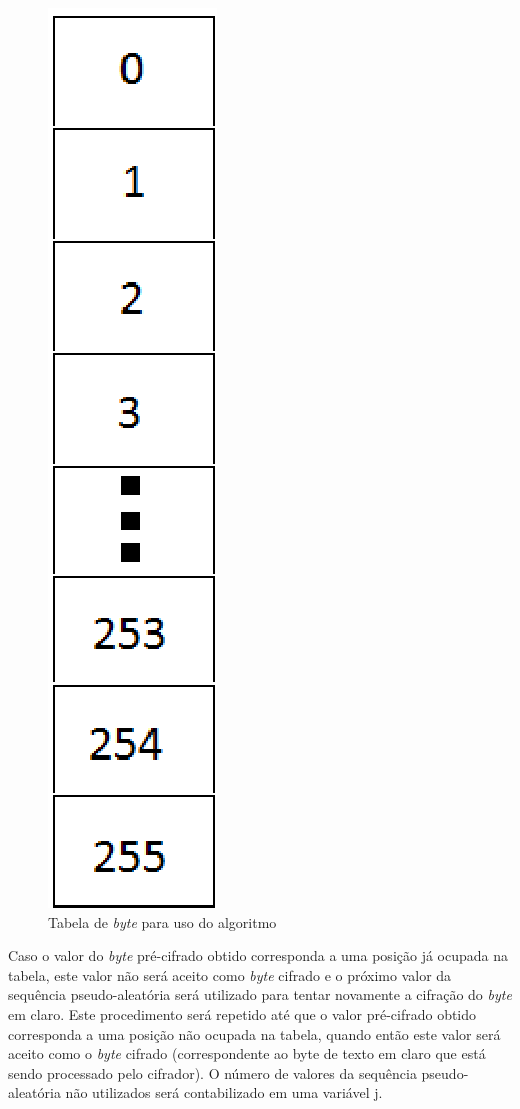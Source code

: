 \begin{figure}[h]
	\centering
	\includegraphics[scale=0.7]{figuras/tabela.eps}
	\caption{Tabela de \textit{byte} para uso do algoritmo}
\end{figure}

Caso o valor do \textit{byte} pré-cifrado obtido corresponda a uma posição já ocupada na tabela, este valor não será aceito como \textit{byte} cifrado e o próximo valor da sequência pseudo-aleatória será utilizado para tentar novamente a cifração do \textit{byte} em claro. Este procedimento será repetido até que o valor pré-cifrado obtido corresponda a uma posição não ocupada na tabela, quando então este valor será aceito como o \textit{byte} cifrado (correspondente ao byte de texto em claro que está sendo processado pelo cifrador). O número de valores da sequência pseudo-aleatória não utilizados será contabilizado em uma variável j. 

